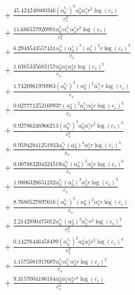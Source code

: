\documentclass[10pt]{article}
\begin{document}
\begin{align*}
&{}  + \frac{45.424248860346 \left(\alpha_{0}^{c_s}\right)^{3} \alpha_{0}^s \alpha_{1}^s r^{2} \log{\left(c_{s} \right)}}{c_{s}^{2}} \\
&{}  + \frac{11.686557920991 \alpha_{0}^{c_s} \alpha_{1}^{c_s} \alpha_{2}^s r^{2} \log{\left(c_{s} \right)}}{c_{s}^{2}} \\
&{}  + \frac{6.2948543557431 \alpha_{0}^{c_s} \left(\alpha_{0}^s\right)^{2} \left(\alpha_{1}^s\right)^{2} r \log{\left(c_{s} \right)}^{2}}{c_{s}} \\
&{}  + \frac{1.6365335683157 \alpha_{0}^s \alpha_{1}^s \alpha_{3}^s r \log{\left(c_{s} \right)}^{2}}{c_{s}} \\
&{}  + \frac{1.7420961970983 \left(\alpha_{0}^{c_s}\right)^{3} \left(\alpha_{0}^s\right)^{2} \alpha_{1}^{c_s} r \log{\left(c_{s} \right)}}{c_{s}} \\
&{}  + \frac{0.027771252169937 \left(\alpha_{0}^s\right)^{2} \alpha_{1}^{c_s} \alpha_{2}^s r \log{\left(c_{s} \right)}^{5}}{c_{s}} \\
&{}  + \frac{0.92786246966213 \left(\alpha_{0}^{c_s}\right)^{3} \alpha_{0}^s \alpha_{1}^s r^{2} \log{\left(c_{s} \right)}^{3}}{c_{s}^{2}} \\
&{}  + \frac{0.95942841251933 \alpha_{0}^{c_s} \left(\alpha_{0}^s\right)^{4} \alpha_{1}^s r \log{\left(c_{s} \right)}^{3}}{c_{s}} \\
&{}  + \frac{0.007883204324519 \alpha_{0}^{c_s} \left(\alpha_{0}^s\right)^{3} \alpha_{2}^s r \log{\left(c_{s} \right)}^{6}}{c_{s}} \\
&{}  + \frac{1.0806328651232 \alpha_{0}^{c_s} \left(\alpha_{0}^s\right)^{2} \alpha_{3}^s r \log{\left(c_{s} \right)}^{3}}{c_{s}} \\
&{}  + \frac{8.7680527897616 \left(\alpha_{0}^{c_s}\right)^{3} \left(\alpha_{0}^s\right)^{2} \alpha_{1}^s r \log{\left(c_{s} \right)}}{c_{s}} \\
&{}  + \frac{2.2142890475012 \alpha_{0}^{c_s} \left(\alpha_{0}^s\right)^{2} \alpha_{2}^{c_s} r^{2} \log{\left(c_{s} \right)}^{2}}{c_{s}^{2}} \\
&{}  + \frac{0.14276446458499 \left(\alpha_{0}^{c_s}\right)^{2} \alpha_{0}^s \alpha_{2}^s r^{2} \log{\left(c_{s} \right)}^{4}}{c_{s}^{2}} \\
&{}  + \frac{1.1575081917687 \alpha_{0}^{c_s} \alpha_{1}^{c_s} \alpha_{3}^s r \log{\left(c_{s} \right)}^{2}}{c_{s}} \\
&{}  + \frac{9.3157004186184 \alpha_{0}^s \alpha_{1}^s \alpha_{2}^s r^{2} \log{\left(c_{s} \right)}}{c_{s}^{2}} \\

\end{align*}
\end{document}

